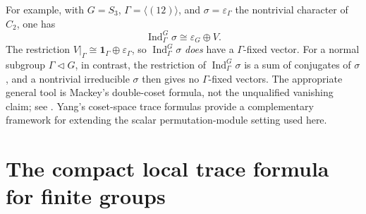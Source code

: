 \documentclass[12pt]{article}
\theoremstyle{remark}
\newcommand{\Ind}{\operatorname{Ind}}
\newcommand{\id}{\mathbf 1}
\newcommand{\eps}{\varepsilon}
\begin{document}
For example, with $G=S_3$, $\Gamma=\langle(12)\rangle$, and
$\sigma=\eps_\Gamma$ the nontrivial character of $C_2$, one has
\[
 \Ind_\Gamma^G\sigma\cong\eps_G\oplus V.
\]
The restriction $V|_\Gamma\cong\id_\Gamma\oplus\eps_\Gamma$,
so $\Ind_\Gamma^G\sigma$ \emph{does} have a
$\Gamma$-fixed vector.  For a normal subgroup $\Gamma\lhd G$,
in contrast, the restriction of $\Ind_\Gamma^G\sigma$ is a sum
of conjugates of $\sigma$, and a nontrivial irreducible $\sigma$
then gives no $\Gamma$-fixed vectors.  The appropriate general tool
is Mackey's double-coset formula, not the unqualified vanishing claim;
see \cite[Chapters 7--8]{Serre}. Yang's coset-space trace formulas
\cite{Yang2006} provide a complementary framework for extending
the scalar permutation-module setting used here.

\section{The compact local trace formula for finite groups}
\end{document}
